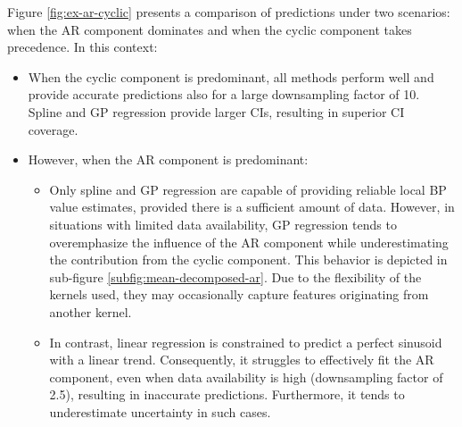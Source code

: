Figure \ref{fig:ex-ar-cyclic} presents a comparison of predictions under two
scenarios: when the AR component dominates and when the cyclic component takes precedence. In this context:

\begin{itemize}
    \item When the cyclic component is predominant, all methods perform well and
    provide accurate predictions also for a large downsampling factor of 10.
    Spline and GP regression provide larger CIs, resulting in superior CI coverage.
    \item However, when the AR component is predominant:
    \begin{itemize}
        \item Only spline and GP regression are capable of providing
        reliable local BP value estimates, provided there is a sufficient amount of data.
        However, in situations with limited data availability,
        GP regression tends to overemphasize the influence of
        the AR component while underestimating the contribution from the cyclic component.
        This behavior is depicted in sub-figure \ref{subfig:mean-decomposed-ar}.
        Due to the flexibility of the kernels used, they may occasionally
        capture features originating from another kernel.
        \item In contrast, linear regression is constrained to predict a perfect
        sinusoid with a linear trend. Consequently, it struggles to effectively
        fit the AR component, even when data availability is high
        (downsampling factor of 2.5), resulting in inaccurate predictions.
        Furthermore, it tends to underestimate uncertainty in such cases.
    \end{itemize}
\end{itemize}


